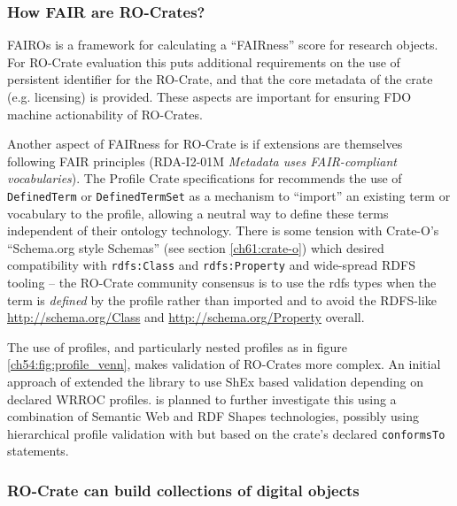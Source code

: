 \subsubsection{How FAIR are RO-Crates?}
\label{ch61:fair-crates}

FAIROs \cite{FAIROs} is a framework for calculating a ``FAIRness'' score for research objects. For RO-Crate evaluation this puts additional requirements on the use of persistent identifier for the RO-Crate, and that the core metadata of the crate (e.g. licensing) is provided. These aspects are important for ensuring FDO machine actionability of RO-Crates.

Another aspect of FAIRness for RO-Crate is if extensions are themselves following FAIR principles (RDA-I2-01M \emph{Metadata uses FAIR-compliant vocabularies}).  The Profile Crate specifications for  recommends the use of \texttt{DefinedTerm} or \texttt{DefinedTermSet} as a mechanism to ``import'' an existing term or vocabulary to the profile, allowing a neutral way to define these terms independent of their ontology technology. There is some tension with Crate-O's   ``Schema.org style Schemas'' (see section \vref{ch61:crate-o}) which desired compatibility with \texttt{rdfs:Class} and \texttt{rdfs:Property} and wide-spread RDFS tooling -- the RO-Crate community consensus is to use the rdfs types when the term is \emph{defined} by the profile rather than imported and to avoid the RDFS-like \url{http://schema.org/Class} and \url{http://schema.org/Property} overall.

The use of profiles, and particularly nested profiles as in figure \vref{ch54:fig:profile_venn}, makes validation of RO-Crates more complex. An initial approach of  extended the  library to use ShEx based validation \cite{ShapeExpressionsShEx} depending on declared WRROC profiles.
 is planned to further investigate this using a combination of Semantic Web and RDF Shapes technologies, possibly using hierarchical profile validation with  but based on the crate's declared \texttt{conformsTo} statements.


\subsubsection{RO-Crate can build collections of digital objects}
\label{ch61:collections}

